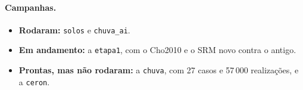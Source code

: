 \paragraph{Campanhas.}
\begin{itemize}
  \item \textbf{Rodaram:} \texttt{solos} e \texttt{chuva\_ai}.
  \item \textbf{Em andamento:} a \texttt{etapa1}, com o Cho2010 e o SRM novo contra o antigo.
  \item \textbf{Prontas, mas não rodaram:} a \texttt{chuva}, com 27 casos e 57\,000 realizações, e a \texttt{ceron}.
\end{itemize}
